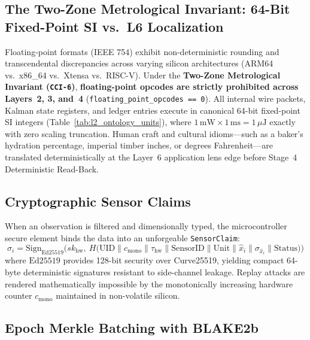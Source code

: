 \subsection{The Two-Zone Metrological Invariant: 64-Bit Fixed-Point SI vs.\ L6 Localization}

Floating-point formats (IEEE 754) exhibit non-deterministic rounding and transcendental discrepancies across varying silicon architectures (ARM64 vs.\ x86\_64 vs.\ Xtensa vs.\ RISC-V). Under the \textbf{Two-Zone Metrological Invariant (\texttt{CCI-6})}, \textbf{floating-point opcodes are strictly prohibited across Layers~2, 3, and~4} (\texttt{floating\_point\_opcodes == 0}). All internal wire packets, Kalman state registers, and ledger entries execute in canonical 64-bit fixed-point SI integers (Table~\ref{tab:l2_ontology_units}), where $1\,\mathrm{mW} \times 1\,\mathrm{ms} = 1\,\mu\mathrm{J}$ exactly with zero scaling truncation. Human craft and cultural idioms---such as a baker's hydration percentage, imperial timber inches, or degrees Fahrenheit---are translated deterministically at the Layer~6 application lens edge before Stage~4 Deterministic Read-Back.

\subsection{Cryptographic Sensor Claims}

When an observation is filtered and dimensionally typed, the microcontroller secure element binds the data into an unforgeable \texttt{SensorClaim}:
\begin{equation}
\sigma_i = \mathrm{Sign}_{\mathrm{Ed25519}}\Big(sk_{\mathrm{hw}}, \ H\big(\mathrm{UID} \parallel c_{\mathrm{mono}} \parallel \tau_{\mathrm{hw}} \parallel \mathrm{SensorID} \parallel \mathrm{Unit} \parallel \hat{x}_i \parallel \sigma_{\hat{x}_i} \parallel \mathrm{Status}\big)\Big)
\label{eq:l2_sensor_claim_sig}
\end{equation}
where $\mathrm{Ed25519}$ provides 128-bit security over Curve25519, yielding compact 64-byte deterministic signatures resistant to side-channel leakage. Replay attacks are rendered mathematically impossible by the monotonically increasing hardware counter $c_{\mathrm{mono}}$ maintained in non-volatile silicon.

\subsection{Epoch Merkle Batching with BLAKE2b}

